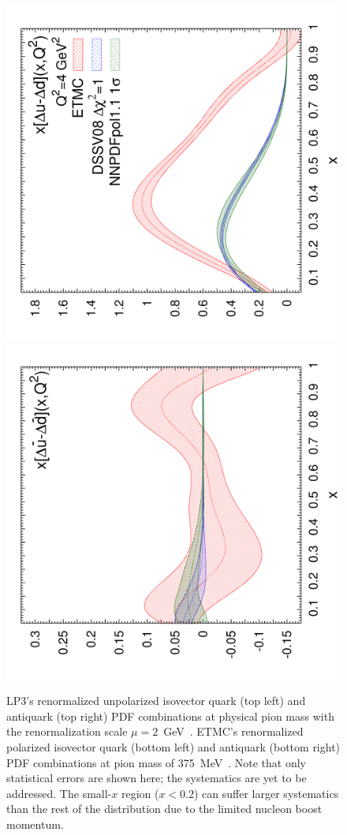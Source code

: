\begin{figure}[!t]
\includegraphics[scale=0.22,angle=270]{plots/polxq}
\includegraphics[scale=0.22,angle=270]{plots/polxqbar}\\
\caption{\small LP3's renormalized unpolarized isovector quark (top left) and 
  antiquark (top right) PDF combinations at physical pion mass with the renormalization scale 
  $\mu=2$~GeV~\cite{Lin:2017ani}. 
  ETMC's renormalized polarized isovector quark (bottom left) and antiquark
  (bottom right) PDF combinations at pion mass of 
  375~MeV~\cite{Alexandrou:2017huk}.
  Note that only statistical errors are shown here; the systematics are yet to be addressed. The small-$x$ region ($x< 0.2$) can suffer larger systematics than the rest of the distribution due to the limited nucleon boost momentum.
  } 
\label{fig:qPDF-demo}
\end{figure}
